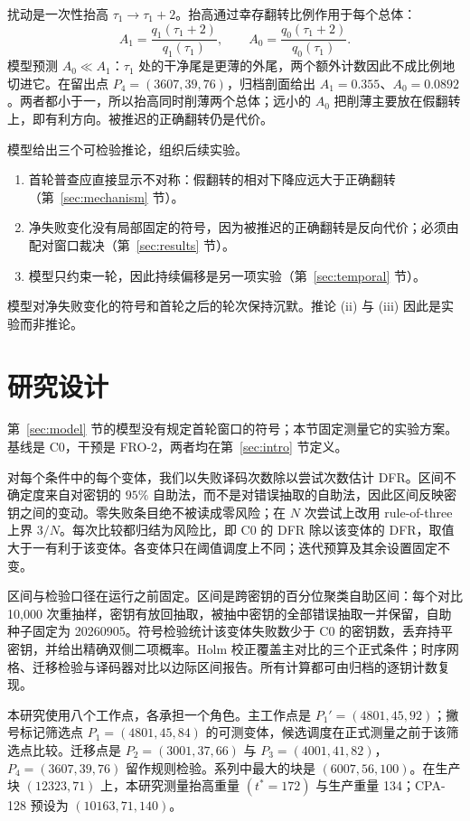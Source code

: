 \documentclass[UTF8,a4paper,10pt,twocolumn]{ctexart}
\begin{document}
扰动是一次性抬高 $\tau_1\to\tau_1+2$。抬高通过幸存翻转比例作用于每个总体：
\begin{equation}\label{eq:multipliers}
A_1=\frac{q_1(\tau_1+2)}{q_1(\tau_1)},\qquad
A_0=\frac{q_0(\tau_1+2)}{q_0(\tau_1)} .
\end{equation}
模型预测 $A_0\ll A_1$：$\tau_1$ 处的干净尾是更薄的外尾，两个额外计数因此不成比例地切进它。在留出点 $P_4=(3607,39,76)$，归档剖面给出 $A_1 = 0.355$、$A_0 = 0.0892$。两者都小于一，所以抬高同时削薄两个总体；远小的 $A_0$ 把削薄主要放在假翻转上，即有利方向。被推迟的正确翻转仍是代价。

模型给出三个可检验推论，组织后续实验。
\begin{enumerate}[label=(\roman*),leftmargin=*,itemsep=1pt,topsep=2pt]
\item 首轮普查应直接显示不对称：假翻转的相对下降应远大于正确翻转（第~\ref{sec:mechanism} 节）。
\item 净失败变化没有局部固定的符号，因为被推迟的正确翻转是反向代价；必须由配对窗口裁决（第~\ref{sec:results} 节）。
\item 模型只约束一轮，因此持续偏移是另一项实验（第~\ref{sec:temporal} 节）。
\end{enumerate}
模型对净失败变化的符号和首轮之后的轮次保持沉默。推论 (ii) 与 (iii) 因此是实验而非推论。
\section{研究设计}\label{sec:method}

第~\ref{sec:model} 节的模型没有规定首轮窗口的符号；本节固定测量它的实验方案。基线是 C0，干预是 FRO-2，两者均在第~\ref{sec:intro} 节定义。

对每个条件中的每个变体，我们以失败译码次数除以尝试次数估计 DFR。区间不确定度来自对密钥的 $95\%$ 自助法，而不是对错误抽取的自助法，因此区间反映密钥之间的变动。零失败条目绝不被读成零风险；在 $N$ 次尝试上改用 rule-of-three 上界 $3/N$。每次比较都归结为风险比，即 C0 的 DFR 除以该变体的 DFR，取值大于一有利于该变体。各变体只在阈值调度上不同；迭代预算及其余设置固定不变。

区间与检验口径在运行之前固定。区间是跨密钥的百分位聚类自助区间：每个对比 10{,}000 次重抽样，密钥有放回抽取，被抽中密钥的全部错误抽取一并保留，自助种子固定为 20260905。符号检验统计该变体失败数少于 C0 的密钥数，丢弃持平密钥，并给出精确双侧二项概率。Holm 校正覆盖主对比的三个正式条件；时序网格、迁移检验与译码器对比以边际区间报告。所有计算都可由归档的逐钥计数复现。

本研究使用八个工作点，各承担一个角色。主工作点是 $P_1'=(4801,45,92)$；撇号标记筛选点 $P_1=(4801,45,84)$ 的可测变体，候选调度在正式测量之前于该筛选点比较。迁移点是 $P_2=(3001,37,66)$ 与 $P_3=(4001,41,82)$，$P_4=(3607,39,76)$ 留作规则检验。系列中最大的块是 $(6007,56,100)$。在生产块 $(12323,71)$ 上，本研究测量抬高重量 $(t^{\ast}=172)$ 与生产重量 134；CPA-128 预设为 $(10163,71,140)$。
\end{document}
